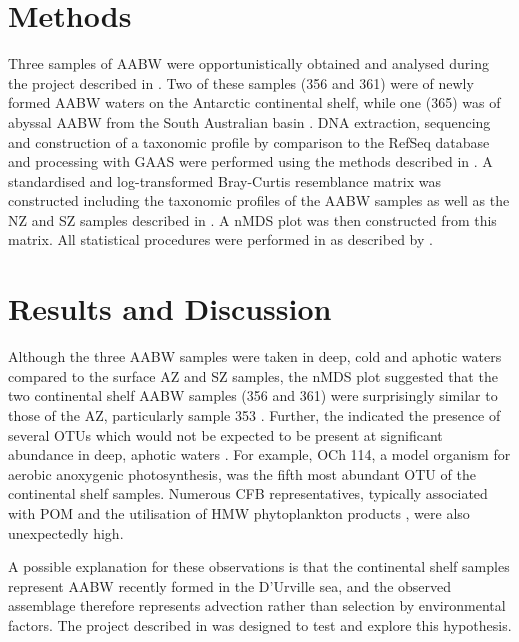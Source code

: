 \section{Methods}




Three samples of \ac{AABW} were opportunistically obtained and analysed during the project described in  .
Two of these samples (356 and 361) were of newly formed \ac{AABW} waters on the Antarctic continental shelf, while one (365) was of abyssal \ac{AABW} from the South Australian basin .
DNA extraction, sequencing and construction of a taxonomic profile by  comparison to the RefSeq database and processing with \ac{GAAS} were performed using the methods described in .
A standardised and log-transformed Bray-Curtis resemblance matrix was constructed including the taxonomic profiles of the \ac{AABW} samples as well as the \ac{NZ} and \ac{SZ} samples described in .
A \ac{nMDS} plot was then constructed from this matrix.
All statistical procedures were performed in  as described by \citet{Clarke:2001ut}.

\section{Results and Discussion}

Although the three \ac{AABW} samples were taken in deep, cold and aphotic waters  compared to the surface \ac{AZ} and \ac{SZ} samples, the \ac{nMDS} plot suggested that the two continental shelf \ac{AABW} samples (356 and 361) were surprisingly similar to those of the \ac{AZ}, particularly sample 353 .
Further, the indicated the presence of several \acp{OTU} which would not be expected to be present at significant abundance in deep, aphotic waters .
For example,  OCh 114, a model organism for aerobic anoxygenic photosynthesis, was the fifth most abundant \ac{OTU} of the continental shelf samples.
Numerous \ac{CFB} representatives, typically associated with \ac{POM} and the utilisation of \ac{HMW} phytoplankton products \citep[e.g.][]{Williams:2012gsa}, were also unexpectedly high.



A possible explanation for these observations is that the continental shelf samples represent \ac{AABW} recently formed in the D'Urville sea, and the observed assemblage therefore represents advection rather than selection by environmental factors.
The project described in  was designed to test and explore this hypothesis.


